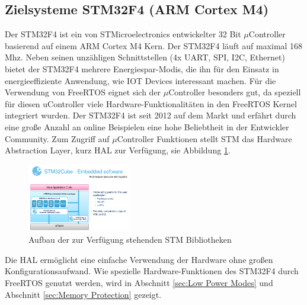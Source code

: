 \subsection{Zielsysteme STM32F4 (ARM Cortex M4)}
\label{sec:Zielsysteme}
Der STM32F4 ist ein von STMicroelectronics entwickelter 32 Bit $\mu$Controller basierend auf einem ARM Cortex M4 Kern. Der STM32F4 läuft auf maximal 168 Mhz. Neben seinen unzähligen Schnittstellen (4x UART, SPI, I2C, Ethernet) bietet der STM32F4 mehrere Energiespar-Modis, die ihn für den Einsatz in energieeffiziente Anwendung, wie IOT Devices interessant machen. Für die Verwendung von FreeRTOS eignet sich der $\mu$Controller besonders gut, da speziell für diesen uController viele Hardware-Funk\-tio\-na\-li\-tät\-en in den FreeRTOS Kernel integriert wurden. Der STM32F4 ist seit 2012 auf dem Markt und erfährt durch eine große Anzahl an online Beispielen eine hohe Beliebtheit in der Entwickler Community. Zum Zugriff auf $\mu$Controller Funktionen stellt STM das Hardware Abstraction Layer, kurz HAL zur Verfügung, sie Abbildung \ref{fig:HAL}.      
\begin{figure}[htb!]
	\centering
		\includegraphics[width=0.4\textwidth]{Pictures/STM32F4/LibraryEntry.png}
	\caption{Aufbau der zur Verfügung stehenden STM Bibliotheken }
	\label{fig:HAL}
\end{figure}
\newline
Die HAL ermöglicht eine einfache Verwendung der Hardware ohne großen Konfigurationsaufwand. Wie spezielle Hardware-Funktionen des STM32F4 durch FreeRTOS genutzt werden, wird in Abschnitt \ref{sec:Low Power Modes} und Abschnitt \ref{sec:Memory Protection} gezeigt.